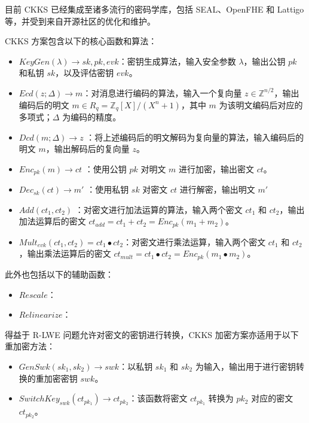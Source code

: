 目前 CKKS 已经集成至诸多流行的密码学库，包括 SEAL、OpenFHE 和 Lattigo 等\cite{sealcrypto,OpenFHE,Mouchet2020LattigoAM}，并受到来自开源社区的优化和维护。

CKKS 方案包含以下的核心函数和算法：

\begin{itemize}
    \item $KeyGen(\lambda) \rightarrow sk, pk, evk$：密钥生成算法，输入安全参数 $\lambda$，输出公钥 $pk$ 和私钥 $sk$，以及评估密钥 $evk$。
    \item $Ecd(z; \Delta) \rightarrow m$：对消息进行编码的算法，输入一个复向量 $z \in \mathbb{Z}^{n/2}$，输出编码后的明文 $m \in R_q = \mathbb{Z}_q[X]/(X^n+1)$，其中 $m$ 为该明文编码后对应的多项式；$\Delta$ 为编码的精度。
    \item $Dcd(m; \Delta) \rightarrow z$ ：将上述编码后的明文解码为复向量的算法，输入编码后的明文 $m$，输出解码后的复向量 $z$。
    \item $Enc_{pk}(m) \rightarrow ct$ ：使用公钥 $pk$ 对明文 $m$ 进行加密，输出密文 $ct$。
    \item $Dec_{sk}(ct) \rightarrow m'$ ：使用私钥 $sk$ 对密文 $ct$ 进行解密，输出明文 $m'$
    \item $Add(ct_1, ct_2)$ ：对密文进行加法运算的算法，输入两个密文 $ct_1$ 和 $ct_2$，输出加法运算后的密文 $ct_{add} = ct_1 + ct_2 = Enc_{pk}(m_1 + m_2)$。
    \item $Mult_{evk}(ct_1, ct_2) = ct_1 \bullet ct_2$：对密文进行乘法运算，输入两个密文 $ct_1$ 和 $ct_2$，输出乘法运算后的密文 $ct_{mult} = ct_1 \bullet ct_2 = Enc_{pk}(m_1 \bullet m_2)$。
\end{itemize}

此外也包括以下的辅助函数：

\begin{itemize}
    \item $Rescale$：
    \item $Relinearize$：
\end{itemize}

得益于 R-LWE 问题允许对密文的密钥进行转换\cite{brakerski2014leveled}，CKKS 加密方案亦适用于以下重加密方法：

\begin{itemize}
    \item $GenSwk(sk_1, sk_2) \rightarrow swk$：以私钥 $sk_1$ 和 $sk_2$ 为输入，输出用于进行密钥转换的重加密密钥 $swk$。
    \item $SwitchKey_{swk}(ct_{pk_1}) \rightarrow ct_{pk_2}$：该函数将密文 $ct_{pk_1}$ 转换为 $pk_2$ 对应的密文 $ct_{pk_2}$。
\end{itemize}

